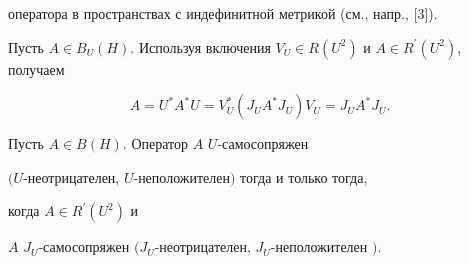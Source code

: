 оператора в пространствах с индефинитной метрикой (см., напр., [3]).





Пусть $A\in B_{U}(H)$. Используя включения $V_{U}\in R(U^{2})$ и $A\in


R^{\prime}(U^{2})$, получаем


\begin{equation}


A=U^{*}A^{*}U=V_{U}^{*}(J_{U}A^{*}J_{U})V_{U}=J_{U}A^{*}J_{U}.


\end{equation}





\begin{prop}


Пусть $A\in B(H)$. Оператор $A$\; $U$-самосопряжен


$(U$-неотрицателен, $U$-неположителен$)$ тогда и только тогда,


когда $A\in R^{\prime}(U^{2})$ и


$A$ $J_{U}$-самосопряжен $(J_{U}$-неотрицателен, $J_{U}$-неположителен $)$.


\end{prop}





